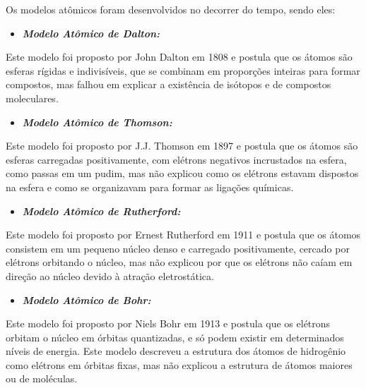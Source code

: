 \documentclass[11pt,a4paper]{article}
\begin{document}
            Os modelos atômicos foram desenvolvidos no decorrer do tempo, sendo eles:
            
            \begin{itemize}
                \item \textbf{\textit{\textcolor{CarnationPink}{Modelo Atômico de Dalton:}}}
            \end{itemize}

                Este modelo foi proposto por John Dalton em 1808 e postula que os átomos são esferas rígidas e indivisíveis, que se combinam em proporções inteiras para formar compostos, mas falhou em explicar a existência de isótopos e de compostos moleculares.

            \begin{itemize}
                \item \textbf{\textit{\textcolor{CarnationPink}{Modelo Atômico de Thomson:}}}
            \end{itemize}

                Este modelo foi proposto por J.J. Thomson em 1897 e postula que os átomos são esferas carregadas positivamente, com elétrons negativos incrustados na esfera, como passas em um pudim, mas não explicou como os elétrons estavam dispostos na esfera e como se organizavam para formar as ligações químicas.

            \begin{itemize}
                \item \textbf{\textit{\textcolor{CarnationPink}{Modelo Atômico de Rutherford:}}}
            \end{itemize}

                Este modelo foi proposto por Ernest Rutherford em 1911 e postula que os átomos consistem em um pequeno núcleo denso e carregado positivamente, cercado por elétrons orbitando o núcleo, mas não explicou por que os elétrons não caíam em direção ao núcleo devido à atração eletrostática.

            \begin{itemize}
                \item \textbf{\textit{\textcolor{CarnationPink}{Modelo Atômico de Bohr:}}}
            \end{itemize}

                Este modelo foi proposto por Niels Bohr em 1913 e postula que os elétrons orbitam o núcleo em órbitas quantizadas, e só podem existir em determinados níveis de energia. Este modelo descreveu a estrutura dos átomos de hidrogênio como elétrons em órbitas fixas, mas não explicou a estrutura de átomos maiores ou de moléculas.
\end{document}
